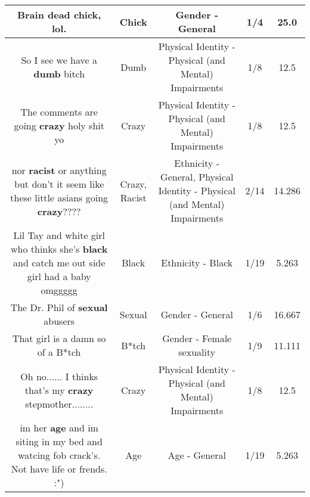 \documentclass[11pt]{article}
\newlength\mylength
\begin{document}
\begin{center}
\begin{longtable}{|C{.65\mylength}|C{.30\mylength}|C{.12\mylength}|C{.12\mylength}|C{.12\mylength}|}
  \small Brain dead \textbf{chick}, lol.\normalsize   & Chick & Gender - General & 1/4 & 25.0 \\  \hline
  \small So I see we have a \textbf{dumb} bitch\normalsize   & Dumb & Physical Identity - Physical (and Mental) Impairments & 1/8 & 12.5 \\  \hline
  \small The comments are going \textbf{crazy} holy shit yo\normalsize   & Crazy & Physical Identity - Physical (and Mental) Impairments & 1/8 & 12.5 \\  \hline
  \small nor \textbf{racist} or anything but don't it seem like these little asians going \textbf{crazy}????\normalsize   & Crazy, Racist & Ethnicity - General, Physical Identity - Physical (and Mental) Impairments & 2/14 & 14.286 \\  \hline
  \small Lil Tay and white girl who thinks she's \textbf{black} and catch me out side girl had a baby omggggg\normalsize   & Black & Ethnicity - Black & 1/19 & 5.263 \\  \hline
  \small The Dr. Phil of \textbf{sexual} abusers\normalsize   & Sexual & Gender - General & 1/6 & 16.667 \\  \hline
  \small That girl is a damn so of a B*tch\normalsize   & B*tch & Gender - Female sexuality & 1/9 & 11.111 \\  \hline
  \small Oh no...... I thinks that's my \textbf{crazy} stepmother........\normalsize   & Crazy & Physical Identity - Physical (and Mental) Impairments & 1/8 & 12.5 \\  \hline
  \small im her \textbf{age} and im siting in my bed and watcing fob crack's. Not have life or frends. :")\normalsize   & Age & Age - General & 1/19 & 5.263 \\  \hline

\end{longtable}
\end{center}
\end{document}
